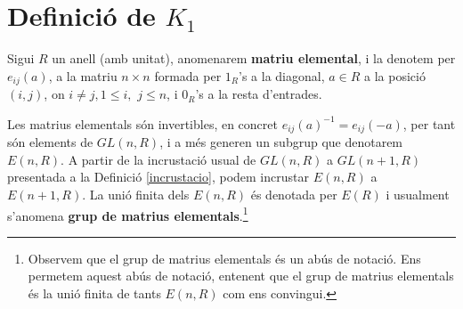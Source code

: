 \section{Definició de $K_1$}
\begin{definition}
Sigui $R$ un anell (amb unitat), anomenarem \textbf{matriu elemental}, i la denotem per $e_{ij}(a)$, a la matriu $n\times n$ formada per $1_R$'s a la diagonal, $a\in R$ a la posició $(i,j)$, on $i\neq j, 1\leq i,$ $j\leq n$, i $0_R$'s a la resta d'entrades.
\end{definition}

\begin{obs}
Les matrius elementals són invertibles, en concret $e_{ij}(a)^{-1}=e_{ij}(-a)$, per tant són elements de $GL(n,R)$, i a més generen un subgrup que denotarem $E(n,R)$. A partir de la incrustació usual de $GL(n,R)$ a $GL(n+1,R)$ presentada a la Definició \ref{incrustacio}, podem incrustar $E(n,R)$ a $E(n+1,R)$. La unió finita dels $E(n,R)$ és denotada per $E(R)$ i usualment s'anomena \textbf{grup de matrius elementals}.\footnote{Observem que el grup de matrius elementals és un abús de notació. Ens permetem aquest abús de notació, entenent que el grup de matrius elementals és la unió finita de tants $E(n,R)$ com ens convingui.}
\end{obs}

